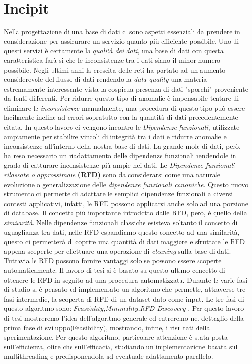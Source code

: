 \section{Incipit}
Nella progettazione di una base di dati ci sono aspetti essenziali da prendere in considerazione per assicurare un servizio quanto più efficiente possibile.
Uno di questi servizi è certamente la \emph{qualità dei dati}, una base di dati con questa caratteristica farà si che le inconsistenze tra i dati siano il minor numero possibile.
Negli ultimi anni la crescita delle reti ha portato ad un aumento considerevole del flusso di dati  rendendo la \emph{data quality} una materia estremamente interessante vista la cospicua presenza di dati "sporchi" proveniente da fonti differenti.
Per ridurre questo tipo di anomalie è impensabile tentare di eliminare le \emph{inconsistenze} manualmente,  una procedura di questo tipo può essere facilmente incline ad errori sopratutto con la quantità di dati precedentemente citata.
In questo lavoro ci vengono incontro le \emph{Dipendenze funzionali}, utilizzate ampiamente per stabilire vincoli di integrità tra i dati e ridurre anomalie e inconsistenze all'interno della nostra base di dati.
La grande mole di dati, però, ha reso necessario un riadattamento delle dipendenze funzionali rendendole in grado di catturare inconsistenze più ampie nei dati. 
Le \emph{Dipendenze funzionali rilassate o approssimate} \textbf{(RFD)} sono da considerarsi come una naturale evoluzione o generalizzazione delle \emph{dipendenze funzionali canoniche}.
Questo nuovo strumento ci permette di adattare le semplici dipendenze funzionali a diversi contesti applicativi, infatti, le RFD possono applicarsi anche solo ad una porzione di database.
Il concetto più importante introdotto dalle RFD, però, è quello della \emph{similarità}.
Nelle dipendenze funzionali classiche esisteva soltanto il concetto di uguaglianza tra dati, nelle RFD espandiamo questo concetto ad una similarità, questo ci permetterà di coprire una quantità di dati maggiore e sfruttare le RFD appena scoperte per effettuare una operazione di \emph{cleaning} sulla base di dati.
Tuttavia le RFD possono fornire vantaggi solo se possono essere scoperte automaticamente.
Il lavoro di tesi si è basato su questo ultimo concetto di ottenere le RFD in seguito ad una procedura automatizzata.
Durante le varie fasi di studio si è pensato ed implementato un algoritmo che permette, attraverso tre fasi intermedie, la scoperta di RFD di un dataset dato come input.
Le tre fasi di questo algoritmo sono: \emph{Feasibility,Minimality,RFD Discovery} .
Per questo lavoro di tesi mostreremo l'idea dell'algoritmo generale ed entreremo nel dettaglio della prima fase di sviluppo(Feasibility), mostrando, infine, i risultati della sperimentazione.
Per questo algoritmo, particolare attenzione è stata posta sull'efficienza, oltre che sull'efficacia, studiando un'implementazione basata sul multithreading e predisponendola ad eventuale adattamento parallelo.
